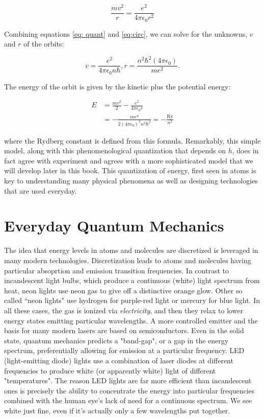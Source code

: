 \begin{equation}
	\frac{mv^2}{r} = \frac{e^2}{4\pi\epsilon_0 r^2} \label{eq:circ}
\end{equation}

Combining equations \ref{eq: quant} and \ref{eq:circ}, we can solve for the unknowns, $ v $ and $ r $ of the orbits:

\begin{equation}
v = \frac{e^2}{4\pi\epsilon_0 n\hbar}, r = \frac{n^2\hbar^2 (4\pi\epsilon_0)}{me^2}.
\end{equation}

The energy of the orbit is given by the kinetic plus the potential energy:

\begin{align}
	E &= \frac{mv^2}{2} - \frac{e^2}{4\pi\epsilon_0 r } \\
	&= -\frac{m e^4}{2(4\pi\epsilon_0)^2 n^2\hbar^2} = -\frac{\text{Ry}}{n^2}
\end{align}

where the Rydberg constant is defined from this formula. Remarkably, this simple model, along with this phenomenological quantization that depends on $ h $, does in fact agree with experiment and agrees with a more sophisticated model that we will develop later in this book. This quantization of energy, first seen in atoms is key to understanding many physical phenomena as well as designing technologies that are used everyday. 

\section{Everyday Quantum Mechanics}

The idea that energy levels in atoms and molecules are discretized is leveraged in many modern technologies. Discretization leads to atoms and molecules having particular absoprtion and emission transition frequencies. In contrast to incandescent light bulbs, which produce a continuous (white) light spectrum from heat, neon lights use neon gas to give off a distinctive orange glow. Other so called ``neon lights" use hydrogen for purple-red light or mercury for blue light. In all these cases, the gas is ionized via \textit{electricity}, and then they relax to lower energy states emitting particular wavelengths. A more controlled emitter and the basis for many modern lasers are based on semiconductors. Even in the solid state, quantum mechanics predicts a "band-gap", or a gap in the energy spectrum, preferentially allowing for emission at a particular frequency. LED (light-emitting diode) lights use a combination of laser diodes at different frequencies to produce white (or apparently white) light of different "temperatures". The reason LED lights are far more efficient than incandescent ones is precisely the ability to concentrate the energy into particular frequencies combined with the human eye's lack of need for a continuous spectrum. We see white just fine, even if it's actually only a few wavelengths put together. 

